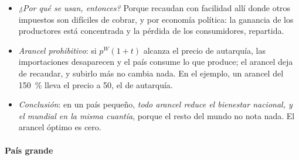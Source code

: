 \documentclass[11pt]{article}
\begin{document}
\begin{itemize}
\item \emph{¿Por qué se usan, entonces?} Porque recaudan con facilidad allí donde otros impuestos son difíciles de cobrar, y por economía política: la ganancia de los productores está concentrada y la pérdida de los consumidores, repartida\nocite{FeenstraTaylor2021International}.
\item \emph{Arancel prohibitivo}: si $p^W(1+t)$ alcanza el precio de autarquía, las importaciones desaparecen y el país consume lo que produce; el arancel deja de recaudar, y subirlo más no cambia nada. En el ejemplo, un arancel del 150~\% lleva el precio a 50, el de autarquía.
\item \emph{Conclusión}: en un país pequeño, \emph{todo arancel reduce el bienestar nacional, y el mundial en la misma cuantía}, porque el resto del mundo no nota nada. El arancel óptimo es cero.
\end{itemize}

\paragraph{País grande}
\end{document}
